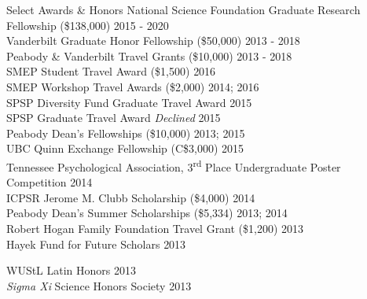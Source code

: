 \begin{rSection}{\textrm{Select Awards \& Honors}}
National Science Foundation Graduate Research Fellowship (\$138,000) 	\hfill{2015 - 2020}\\
Vanderbilt Graduate Honor Fellowship (\$50,000)				\hfill{2013 - 2018}\\	
Peabody \& Vanderbilt Travel Grants (\$10,000)				\hfill  {2013 - 2018}\\
SMEP Student Travel Award (\$1,500)						\hfill{2016}\\
SMEP Workshop Travel Awards (\$2,000)					\hfill{2014; 2016}\\
SPSP Diversity Fund Graduate Travel Award %
\hfill{2015}\\
SPSP Graduate Travel Award %
{\small \textit{Declined}} \hfill{2015}\\
Peabody Dean's Fellowships (\$10,000)					\hfill  {2013; 2015}\\
UBC Quinn Exchange Fellowship (C\$3,000) \hfill{2015}\\
Tennessee Psychological Association, 3\textsuperscript{rd} Place Undergraduate Poster Competition \hfill{2014}\\
ICPSR Jerome M. Clubb Scholarship (\$4,000) \hfill{2014}\\
Peabody Dean's Summer Scholarships (\$5,334)			    \hfill  {2013; 2014}\\	
Robert Hogan Family Foundation Travel Grant (\$1,200) 	\hfill  {2013}\\
Hayek Fund for Future Scholars                      \hfill{2013}\\
\begin{minipage}{\linewidth}
\vspace{1.1mm} WUStL Latin Honors \hfill{2013}\\
\textit{Sigma Xi} Science Honors Society   	\hfill  {2013}
\end{minipage}%
\end{rSection}

